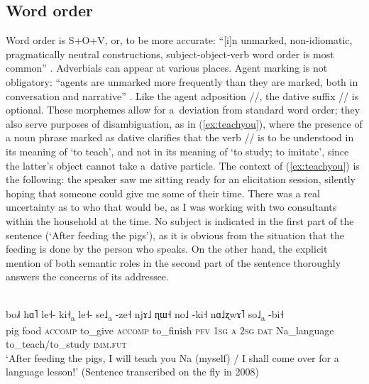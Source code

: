 
\subsection{Word order}
\label{sec:wordorder}

Word order is S+O+V, or, to be more accurate: “[i]n unmarked, non-idiomatic,
pragmatically neutral constructions, subject-object-verb {word order} is
most common” \citep[48]{lidz2007}. Adverbials can appear at various places. Agent marking is not obligatory: “agents are unmarked more frequently than
they are marked, both in conversation and narrative” \citep[51]{lidz2011}. Like the {agent} adposition //, the {dative} suffix // is optional. These morphemes allow for a~deviation from standard {word order}; they also serve purposes of disambiguation, as in (\ref{ex:teachyou}), where the presence of a noun phrase marked as {dative} clarifies that the verb // is to be understood in its meaning of ‘to teach’, and not in its meaning of ‘to study; to imitate’, since the latter's object cannot take a~{dative} particle. The context of (\ref{ex:teachyou}) is the following: the speaker saw me sitting ready for an elicitation session, silently hoping that someone could give me some of their time. There was a real uncertainty as to who that would be, as I was working with two consultants within the household at the time. No subject is indicated in the first part of the sentence (‘After feeding the pigs’), as it is obvious from the situation that the feeding is done by the person who speaks. On the other hand, the explicit mention of both semantic roles in the second part of the sentence thoroughly answers the concerns of its addressee.

\begin{exe}
	\ex
	\label{ex:teachyou}
	\\
	\gll bo˩˧	hɑ˥		le˧-	ki˧\textsubscript{a}			le˧-		se˩\textsubscript{a}		-ze˧		njɤ˩				ɳɯ˧		no˩					-ki˧			nɑ˩ʐwɤ˥				so˩\textsubscript{a}						-bi˧\\
	pig		food		\textsc{accomp}		to\_give	\textsc{accomp}	to\_finish			\textsc{pfv}	\textsc{1sg}	\textsc{a}	\textsc{2sg}	\textsc{dat}	Na\_language		to\_teach/to\_study		\textsc{imm.fut}\\
	\glt ‘After feeding the pigs, I will teach you Na (myself) / I shall come over for a language lesson!’ (Sentence transcribed on the fly in 2008)
\end{exe}

